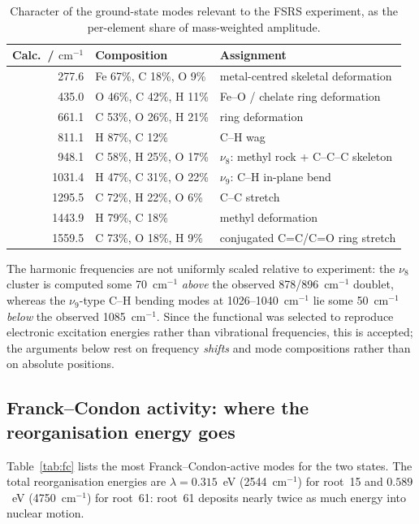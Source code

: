 \documentclass[11pt,a4paper]{article}
\newcommand{\wn}{\ensuremath{\mathrm{cm^{-1}}}}
\begin{document}
\begin{table}[htbp]
\centering
\caption{Character of the ground-state modes relevant to the FSRS
experiment, as the per-element share of mass-weighted amplitude.}
\label{tab:char}
\begin{tabular}{r l l}
\toprule
Calc.\ / \wn{} & Composition & Assignment \\
\midrule
 277.6 & Fe 67\%, C 18\%, O 9\%  & metal-centred skeletal deformation \\
 435.0 & O 46\%, C 42\%, H 11\%  & Fe--O / chelate ring deformation \\
 661.1 & C 53\%, O 26\%, H 21\%  & ring deformation \\
 811.1 & H 87\%, C 12\%          & C--H wag \\
 948.1 & C 58\%, H 25\%, O 17\%  & $\nu_8$: methyl rock + C--C--C skeleton \\
1031.4 & H 47\%, C 31\%, O 22\%  & $\nu_9$: C--H in-plane bend \\
1295.5 & C 72\%, H 22\%, O 6\%   & C--C stretch \\
1443.9 & H 79\%, C 18\%          & methyl deformation \\
1559.5 & C 73\%, O 18\%, H 9\%   & conjugated C=C/C=O ring stretch \\
\bottomrule
\end{tabular}
\end{table}

The harmonic frequencies are not uniformly scaled relative to experiment: the
$\nu_8$ cluster is computed some 70~\wn{} \emph{above} the observed 878/896~\wn{}
doublet, whereas the $\nu_9$-type C--H bending modes at 1026--1040~\wn{} lie
some 50~\wn{} \emph{below} the observed 1085~\wn{}. Since the functional was
selected to reproduce electronic excitation energies rather than vibrational
frequencies, this is accepted; the arguments below rest on frequency
\emph{shifts} and mode compositions rather than on absolute positions.

\subsection{Franck--Condon activity: where the reorganisation energy goes}

Table~\ref{tab:fc} lists the most Franck--Condon-active modes for the two
states. The total reorganisation energies are
$\lambda = 0.315$~eV (2544~\wn{}) for root~15 and $0.589$~eV (4750~\wn{}) for
root~61: root~61 deposits nearly twice as much energy into nuclear motion.
\end{document}
